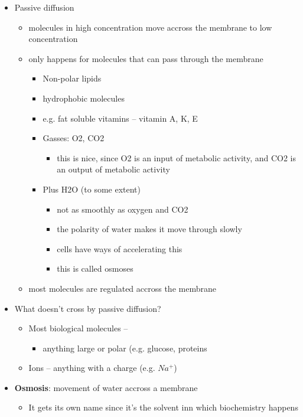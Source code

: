 \documentclass{article}
\theoremstyle{definition}
\begin{document}
\begin{itemize}
	\item Passive diffusion
		\begin{itemize}
			\item molecules in high concentration move accross the membrane to low concentration
			\item only happens for molecules that can pass through the membrane
				\begin{itemize}
					\item Non-polar lipids
					\item hydrophobic molecules
					\item e.g. fat soluble vitamins -- vitamin A, K, E
					\item Gasses: O2, CO2
						\begin{itemize}
							\item this is nice, since O2 is an input of metabolic activity, and CO2 is an output of metabolic activity
						\end{itemize}
					\item Plus H2O (to some extent)
						\begin{itemize}
							\item not as smoothly as oxygen and CO2
							\item the polarity of water makes it move through slowly
							\item cells have ways of accelerating this
							\item this is called osmoses
						\end{itemize}
				\end{itemize}
			\item most molecules are regulated accross the membrane
		\end{itemize}
	\item What doesn't cross by passive diffusion?
		\begin{itemize}
			\item Most biological molecules --
				\begin{itemize}
					\item anything large or polar (e.g. glucose, proteins
				\end{itemize}
			\item Ions -- anything with a charge (e.g. $Na^+$)
		\end{itemize}
	\item \textbf{Osmosis}: movement of water accross a membrane
		\begin{itemize}
			\item It gets its own name since it's the solvent inn which biochemistry happens

\end{itemize}
\end{itemize}
\end{document}
